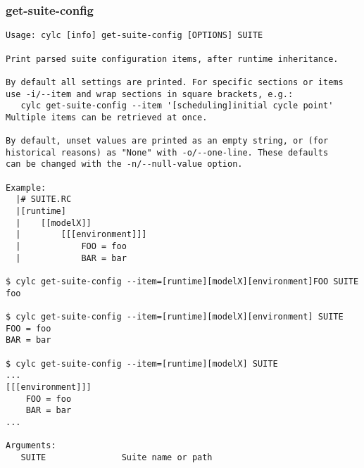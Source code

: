 \subsubsection{get-suite-config}
\label{get-suite-config}
\begin{lstlisting}
Usage: cylc [info] get-suite-config [OPTIONS] SUITE 

Print parsed suite configuration items, after runtime inheritance.

By default all settings are printed. For specific sections or items
use -i/--item and wrap sections in square brackets, e.g.:
   cylc get-suite-config --item '[scheduling]initial cycle point'
Multiple items can be retrieved at once.

By default, unset values are printed as an empty string, or (for
historical reasons) as "None" with -o/--one-line. These defaults
can be changed with the -n/--null-value option.

Example:
  |# SUITE.RC
  |[runtime]
  |    [[modelX]]
  |        [[[environment]]]
  |            FOO = foo
  |            BAR = bar

$ cylc get-suite-config --item=[runtime][modelX][environment]FOO SUITE
foo

$ cylc get-suite-config --item=[runtime][modelX][environment] SUITE
FOO = foo
BAR = bar

$ cylc get-suite-config --item=[runtime][modelX] SUITE
...
[[[environment]]]
    FOO = foo
    BAR = bar
...

Arguments:
   SUITE               Suite name or path


\end{lstlisting}
